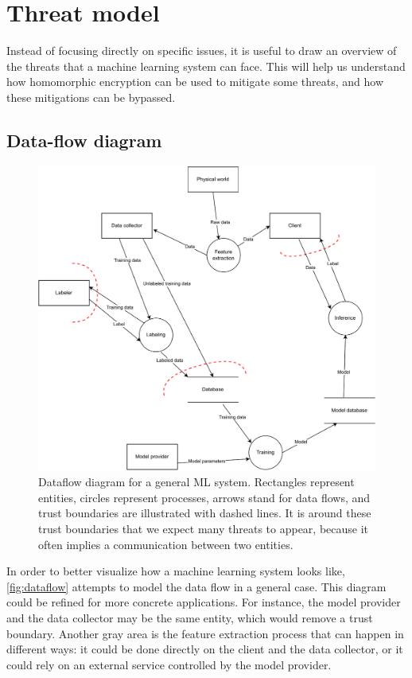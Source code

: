 \documentclass[a4paper,11pt,oneside]{report}
\begin{document}
\section{Threat model}

Instead of focusing directly on specific issues, it is useful to draw an overview of the threats that a machine learning system can face.
This will help us understand how homomorphic encryption can be used to mitigate some threats, and how these mitigations can be bypassed.

\subsection{Data-flow diagram}

\begin{figure}[p]
    \centering
    \includegraphics[width=\textwidth]{figures/dataflow-ml.pdf}
    \caption{Dataflow diagram for a general ML system. Rectangles represent entities, circles represent processes, arrows stand for data flows, and trust boundaries are illustrated with dashed lines. It is around these trust boundaries that we expect many threats to appear, because it often implies a communication between two entities.}
    \label{fig:dataflow}
\end{figure}

In order to better visualize how a machine learning system looks like, \autoref{fig:dataflow} attempts to model the data flow in a general case. 
This diagram could be refined for more concrete applications. 
For instance, the model provider and the data collector may be the same entity, which would remove a trust boundary. 
Another gray area is the feature extraction process that can happen in different ways: it could be done directly on the client and the data collector, or it could rely on an external service controlled by the model provider.
\end{document}

